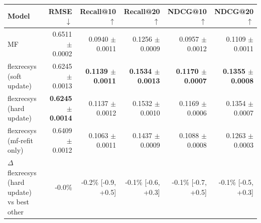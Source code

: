 \begin{tabular}{lrrrrr}
\toprule
Model & RMSE $\downarrow$ & Recall@10 $\uparrow$ & Recall@20 $\uparrow$ & NDCG@10 $\uparrow$ & NDCG@20 $\uparrow$ \\
\midrule
MF & 0.6511 $\pm$ 0.0002 & 0.0940 $\pm$ 0.0011 & 0.1256 $\pm$ 0.0009 & 0.0957 $\pm$ 0.0012 & 0.1109 $\pm$ 0.0011 \\
flexrecsys (soft update) & 0.6245 $\pm$ 0.0013 & \textbf{0.1139 $\pm$ 0.0011} & \textbf{0.1534 $\pm$ 0.0013} & \textbf{0.1170 $\pm$ 0.0007} & \textbf{0.1355 $\pm$ 0.0008} \\
flexrecsys (hard update) & \textbf{0.6245 $\pm$ 0.0014} & 0.1137 $\pm$ 0.0012 & 0.1532 $\pm$ 0.0010 & 0.1169 $\pm$ 0.0006 & 0.1354 $\pm$ 0.0007 \\
flexrecsys (mf-refit only) & 0.6409 $\pm$ 0.0012 & 0.1063 $\pm$ 0.0011 & 0.1437 $\pm$ 0.0009 & 0.1088 $\pm$ 0.0008 & 0.1263 $\pm$ 0.0003 \\
\midrule
$\Delta$ flexrecsys (hard update) vs best other & -0.0\% & -0.2\% [-0.9, +0.5] & -0.1\% [-0.6, +0.3] & -0.1\% [-0.7, +0.5] & -0.1\% [-0.5, +0.3] \\
\bottomrule
\end{tabular}
